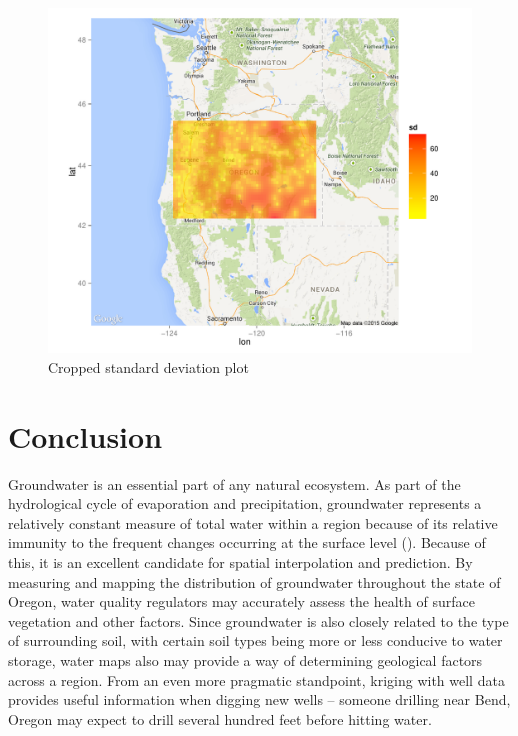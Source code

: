 \documentclass[12pt,twoside]{reedthesis}
\begin{document}
\begin{figure}[h!]
	   
	       \centering
	  
	    \includegraphics[scale=0.7]{sd_crop}
	
	     \caption{Cropped standard deviation plot}
	 \label{sdcrop}
	\end{figure}
	

\chapter*{Conclusion}
	\setcounter{chapter}{4}
	\setcounter{section}{0}
	
Groundwater is an essential part of any natural ecosystem. As part of the hydrological cycle of evaporation and precipitation, groundwater represents a relatively constant measure of total water within a region because of its relative immunity to the frequent changes occurring at the surface level (\cite{groundwater}). Because of this, it is an excellent candidate for spatial interpolation and prediction. By measuring and mapping the distribution of groundwater throughout the state of Oregon, water quality regulators may accurately assess the health of surface vegetation and other factors. Since groundwater is also closely related to the type of surrounding soil, with certain soil types being more or less conducive to water storage, water maps also may provide a way of determining geological factors across a region. From an even more pragmatic standpoint, kriging with well data provides useful information when digging new wells -- someone drilling near Bend, Oregon may expect to drill several hundred feet before hitting water. \\
\end{document}
